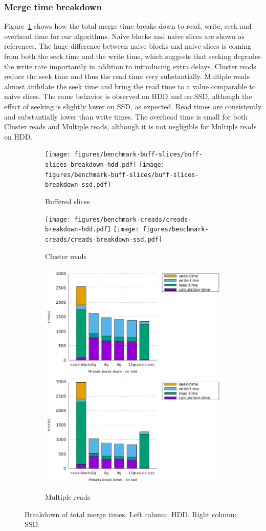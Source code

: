 \documentclass[10pt, conference, compsocconf]{IEEEtran}
\newcommand{\todo}[1]{\marginpar{\parbox{18mm}{\flushleft\tiny\color{red}\textbf{TODO}:
      #1}}}
\begin{document}
\subsubsection{Merge time breakdown}
Figure~\ref{fig:breakdowns-ssd} shows how the total merge time breaks
down to read, write, seek and overhead time for our algorithms. Naive
blocks and naive slices are shown as references. The huge difference
between naive blocks and naive slices is coming from both the seek
time and the write time, which suggests that seeking degrades the
write rate importantly in addition to introducing extra delays.
Cluster reads reduce the seek time and thus the read time very
substantially. Multiple reads almost anihilate the seek time and bring
the read time to a value comparable to naive slices.  The same
behavior is observed on HDD and on SSD, although the effect of seeking
is slightly lower on SSD, as expected. Read times are consistently and substantially lower than write times\todo{explain why}. The overhead time is small for
both Cluster reads and Multiple reads, although it is not negligible
for Multiple reads on HDD.
\begin{figure}
  \begin{subfigure}[b]{\columnwidth}
    \texttt{[image: figures/benchmark-buff-slices/buff-slices-breakdown-hdd.pdf]}
    \texttt{[image: figures/benchmark-buff-slices/buff-slices-breakdown-ssd.pdf]}
    \caption{Buffered slices}
  \end{subfigure}
  \begin{subfigure}[b]{\columnwidth}
    \texttt{[image: figures/benchmark-creads/creads-breakdown-hdd.pdf]}
    \texttt{[image: figures/benchmark-creads/creads-breakdown-ssd.pdf]}
    \caption{Cluster reads}
  \end{subfigure}
  \begin{subfigure}[b]{\columnwidth}
    \includegraphics[width=0.45\columnwidth]{figures/benchmark-mreads/mreads-breakdown-hdd.pdf}
    \includegraphics[width=0.45\columnwidth]{figures/benchmark-mreads/mreads-breakdown-ssd.pdf}
    \caption{Multiple reads}
  \end{subfigure}
  \caption{Breakdown of total merge times. Left column: HDD. Right column: SSD.}
  \label{fig:breakdowns-ssd}
\end{figure}
\end{document}
